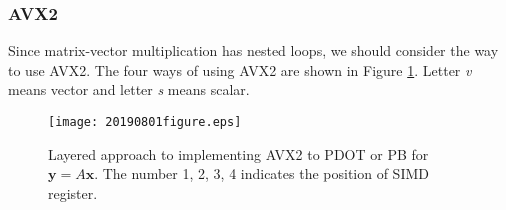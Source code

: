 \documentclass{IOS-Book-Article}
\begin{document}
\subsubsection{AVX2}
Since matrix-vector multiplication has nested loops, we should consider the way to use AVX2. The four ways of using AVX2 are shown in Figure \ref{figimpAVX}. Letter {\it v} means vector and letter {\it s} means scalar. 

\begin{figure}[htbp]
  \begin{center}
    \texttt{[image: 20190801figure.eps]}
    \caption{Layered approach to implementing AVX2 to PDOT or PB for $\bm{y} = A\bm{x}$. The number 1, 2, 3, 4 indicates the position of SIMD register. }
    \label{figimpAVX}
  \end{center}
\end{figure}
\end{document}
